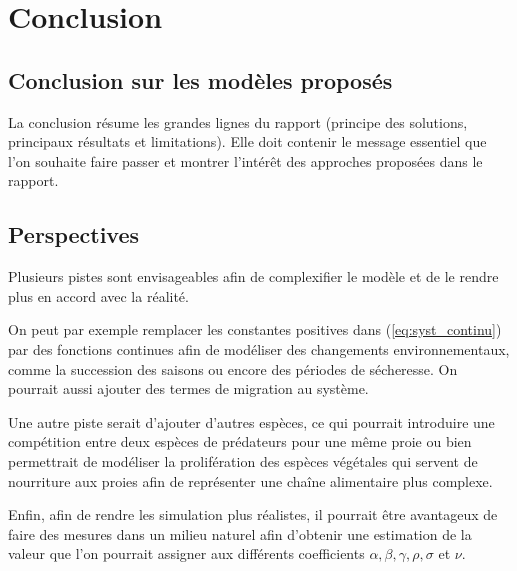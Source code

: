 \chapter{Conclusion}
\label{ch:Conclusion} 

\section{Conclusion sur les modèles proposés}
La conclusion résume les grandes lignes du rapport (principe des solutions, principaux résultats et limitations). Elle doit contenir le message essentiel que l’on souhaite faire passer et montrer l’intérêt des approches proposées dans le rapport.

\section{Perspectives}

Plusieurs pistes sont envisageables afin de complexifier le modèle et de le rendre plus en accord avec la réalité.

On peut par exemple remplacer les constantes positives dans (\ref{eq:syst_continu}) par des fonctions continues afin de modéliser des changements environnementaux, comme la succession des saisons ou encore des périodes de sécheresse. On pourrait aussi ajouter des termes de migration au système.

Une autre piste serait d'ajouter d'autres espèces, ce qui pourrait introduire une compétition entre deux espèces de prédateurs pour une même proie ou bien permettrait de modéliser la prolifération des espèces végétales qui servent de nourriture aux proies afin de représenter une chaîne alimentaire plus complexe.

\vspace{0.5cm}
Enfin, afin de rendre les simulation plus réalistes, il pourrait être avantageux de faire des mesures dans un milieu naturel afin d'obtenir une estimation de la valeur que l'on pourrait assigner aux différents coefficients $\alpha, \beta, \gamma, \rho, \sigma$ et $\nu$.
